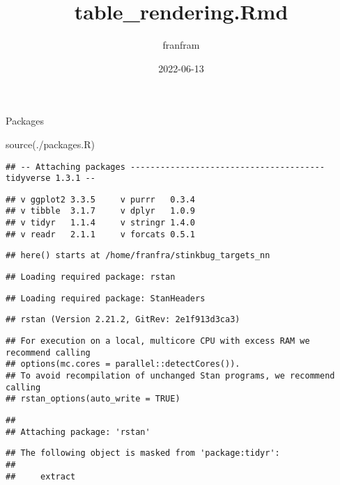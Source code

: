 \documentclass[
]{article}
\title{table\_rendering.Rmd}
\author{franfram}
\date{2022-06-13}
\newenvironment{Shaded}{\begin{snugshade}}{\end{snugshade}}
\newcommand{\FunctionTok}[1]{\textcolor[rgb]{0.00,0.00,0.00}{#1}}
\newcommand{\NormalTok}[1]{#1}
\newcommand{\StringTok}[1]{\textcolor[rgb]{0.31,0.60,0.02}{#1}}
\begin{document}
\maketitle

Packages

\begin{Shaded}
\begin{Highlighting}[]
\FunctionTok{source}\NormalTok{(}\StringTok{\textquotesingle{}./packages.R\textquotesingle{}}\NormalTok{)}
\end{Highlighting}
\end{Shaded}

\begin{verbatim}
## -- Attaching packages --------------------------------------- tidyverse 1.3.1 --
\end{verbatim}

\begin{verbatim}
## v ggplot2 3.3.5     v purrr   0.3.4
## v tibble  3.1.7     v dplyr   1.0.9
## v tidyr   1.1.4     v stringr 1.4.0
## v readr   2.1.1     v forcats 0.5.1
\end{verbatim}

\begin{verbatim}
## here() starts at /home/franfra/stinkbug_targets_nn
\end{verbatim}

\begin{verbatim}
## Loading required package: rstan
\end{verbatim}

\begin{verbatim}
## Loading required package: StanHeaders
\end{verbatim}

\begin{verbatim}
## rstan (Version 2.21.2, GitRev: 2e1f913d3ca3)
\end{verbatim}

\begin{verbatim}
## For execution on a local, multicore CPU with excess RAM we recommend calling
## options(mc.cores = parallel::detectCores()).
## To avoid recompilation of unchanged Stan programs, we recommend calling
## rstan_options(auto_write = TRUE)
\end{verbatim}

\begin{verbatim}
## 
## Attaching package: 'rstan'
\end{verbatim}

\begin{verbatim}
## The following object is masked from 'package:tidyr':
## 
##     extract
\end{verbatim}
\end{document}
